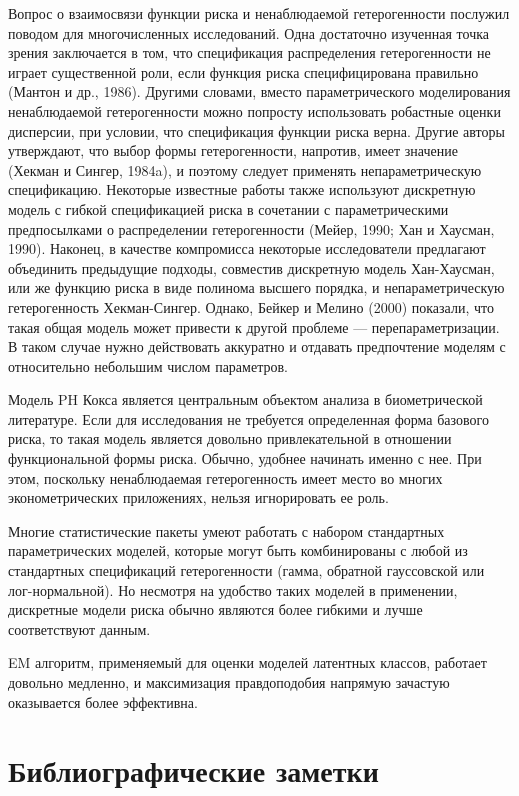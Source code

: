 \noindent
Вопрос о взаимосвязи функции риска и ненаблюдаемой гетерогенности послужил поводом для многочисленных исследований. Одна достаточно изученная точка зрения заключается в том, что спецификация распределения гетерогенности не играет существенной роли, если функция риска специфицирована правильно (Мантон и др., 1986). Другими словами, вместо параметрического моделирования ненаблюдаемой гетерогенности можно попросту использовать робастные оценки дисперсии, при условии, что спецификация функции риска верна. Другие авторы утверждают, что выбор формы гетерогенности, напротив, имеет значение (Хекман и Сингер, 1984a), и поэтому следует применять непараметрическую спецификацию. Некоторые известные работы также используют дискретную модель с гибкой спецификацией риска в сочетании с параметрическими предпосылками о распределении гетерогенности (Мейер, 1990; Хан и Хаусман, 1990). Наконец, в качестве компромисса некоторые исследователи предлагают объединить предыдущие подходы, совместив дискретную модель Хан-Хаусман, или же функцию риска в виде полинома высшего порядка, и непараметрическую гетерогенность Хекман-Сингер. Однако, Бейкер и Мелино (2000) показали, что такая общая модель может привести к другой проблеме --- перепараметризации. В таком случае нужно действовать аккуратно и отдавать предпочтение моделям с относительно небольшим числом параметров.

Модель PH Кокса является центральным объектом анализа в биометрической литературе. Если для исследования не требуется определенная форма базового риска, то такая модель является довольно привлекательной в отношении функциональной формы риска. Обычно, удобнее начинать именно с нее. При этом, поскольку ненаблюдаемая гетерогенность имеет место во многих эконометрических приложениях, нельзя игнорировать ее роль.

Многие статистические пакеты умеют работать с набором стандартных параметрических моделей, которые могут быть комбинированы с любой из стандартных спецификаций гетерогенности (гамма, обратной гауссовской или лог-нормальной). Но несмотря на удобство таких моделей в применении, дискретные модели риска обычно являются более гибкими и лучше соответствуют данным.

EM алгоритм, применяемый для оценки моделей латентных классов, работает довольно медленно, и максимизация правдоподобия напрямую зачастую оказывается более эффективна.




\section{Библиографические заметки}\label{sec:18.10}

